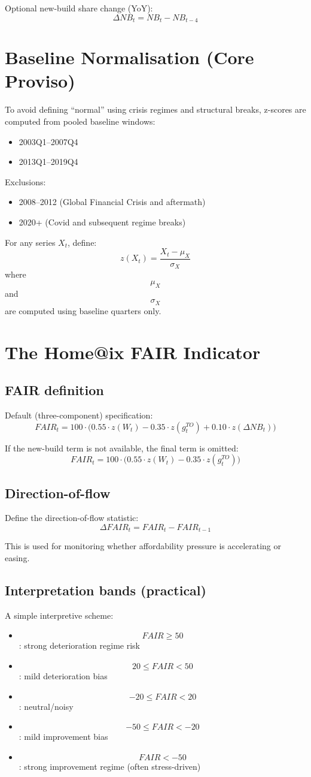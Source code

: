 \documentclass[11pt,a4paper]{article}
\begin{document}
Optional new-build share change (YoY):
$$
\Delta NB_t = NB_t - NB_{t-4}
$$

\section{Baseline Normalisation (Core Proviso)}
To avoid defining ``normal'' using crisis regimes and structural breaks, z-scores are computed from pooled baseline windows:
\begin{itemize}
  \item 2003Q1--2007Q4
  \item 2013Q1--2019Q4
\end{itemize}
Exclusions:
\begin{itemize}
  \item 2008--2012 (Global Financial Crisis and aftermath)
  \item 2020+ (Covid and subsequent regime breaks)
\end{itemize}

For any series $X_t$, define:
$$
z(X_t) = \frac{X_t - \mu_X}{\sigma_X}
$$
where $$\mu_X$$ and $$\sigma_X$$ are computed using baseline quarters only.

\section{The Home@ix FAIR Indicator}
\subsection{FAIR definition}
Default (three-component) specification:
$$
FAIR_t = 100 \cdot \Big( 0.55 \cdot z(W_t) - 0.35 \cdot z(g_t^{TO}) + 0.10 \cdot z(\Delta NB_t) \Big)
$$

If the new-build term is not available, the final term is omitted:
$$
FAIR_t = 100 \cdot \Big( 0.55 \cdot z(W_t) - 0.35 \cdot z(g_t^{TO}) \Big)
$$

\subsection{Direction-of-flow}
Define the direction-of-flow statistic:
$$
\Delta FAIR_t = FAIR_t - FAIR_{t-1}
$$

This is used for monitoring whether affordability pressure is accelerating or easing.

\subsection{Interpretation bands (practical)}
A simple interpretive scheme:
\begin{itemize}
  \item $$FAIR \ge 50$$: strong deterioration regime risk
  \item $$20 \le FAIR < 50$$: mild deterioration bias
  \item $$-20 \le FAIR < 20$$: neutral/noisy
  \item $$-50 \le FAIR < -20$$: mild improvement bias
  \item $$FAIR < -50$$: strong improvement regime (often stress-driven)
\end{itemize}
\end{document}
